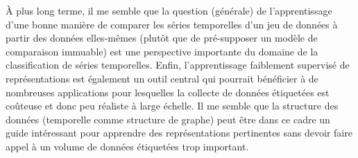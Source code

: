À plus long terme, il me semble que la question (générale) de l'apprentissage
d'une bonne manière de comparer les séries temporelles d'un jeu de données à
partir des données elles-mêmes (plutôt que de pré-supposer un modèle de
comparaison immuable) est une perspective importante du domaine de la
classification de séries temporelles.
Enfin, l'apprentissage faiblement supervisé de représentations
est également un outil central qui pourrait bénéficier à de nombreuses
applications pour lesquelles la collecte de données étiquetées est coûteuse et
donc peu réaliste à large échelle.
Il me semble que la structure des données (temporelle
comme structure de graphe) peut être dans ce cadre un guide intéressant pour
apprendre des représentations pertinentes sans devoir faire appel à un volume de
données étiquetées trop important.
